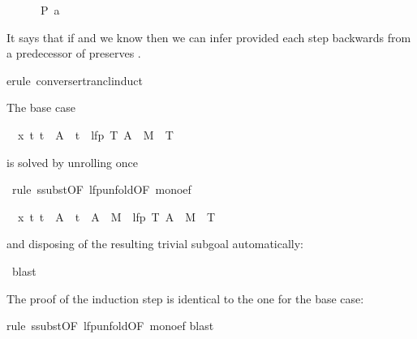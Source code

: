 \begin{isabellebody}
\begin{isamarkuptxt}
\begin{isabelle}
\ \ \ \ \ {\isasymLongrightarrow}\ P\ a%
\end{isabelle}
It says that if  and we know  then we can infer
 provided each step backwards from a predecessor  of
 preserves .%
\end{isamarkuptxt}%
erule\ converse{\isacharunderscore}rtrancl{\isacharunderscore}induct{\isacharparenright}%
\begin{isamarkuptxt}%
\noindent
The base case
\begin{isabelle}%
\ {}{\isachardot}\ {\isasymAnd}x\ t{\isachardot}\ t\ {\isasymin}\ A\ {\isasymLongrightarrow}\ t\ {\isasymin}\ lfp\ {\isacharparenleft}{\isasymlambda}T{\isachardot}\ A\ {\isasymunion}\ M{\isasyminverse}\ {\isacharbackquote}{\isacharbackquote}{\isacharbackquote}\ T{\isacharparenright}%
\end{isabelle}
is solved by unrolling  once%
\end{isamarkuptxt}%
\ rule\ ssubst{\isacharbrackleft}OF\ lfp{\isacharunderscore}unfold{\isacharbrackleft}OF\ mono{\isacharunderscore}ef{\isacharbrackright}{\isacharbrackright}{\isacharparenright}%
\begin{isamarkuptxt}%
\begin{isabelle}%
\ {}{\isachardot}\ {\isasymAnd}x\ t{\isachardot}\ t\ {\isasymin}\ A\ {\isasymLongrightarrow}\ t\ {\isasymin}\ A\ {\isasymunion}\ M{\isasyminverse}\ {\isacharbackquote}{\isacharbackquote}{\isacharbackquote}\ lfp\ {\isacharparenleft}{\isasymlambda}T{\isachardot}\ A\ {\isasymunion}\ M{\isasyminverse}\ {\isacharbackquote}{\isacharbackquote}{\isacharbackquote}\ T{\isacharparenright}%
\end{isabelle}
and disposing of the resulting trivial subgoal automatically:%
\end{isamarkuptxt}%
\ blast{\isacharparenright}%
\begin{isamarkuptxt}%
\noindent
The proof of the induction step is identical to the one for the base case:%
\end{isamarkuptxt}%
rule\ ssubst{\isacharbrackleft}OF\ lfp{\isacharunderscore}unfold{\isacharbrackleft}OF\ mono{\isacharunderscore}ef{\isacharbrackright}{\isacharbrackright}{\isacharparenright}\isanewline
{}blast{\isacharparenright}\isanewline

\end{isabellebody}
